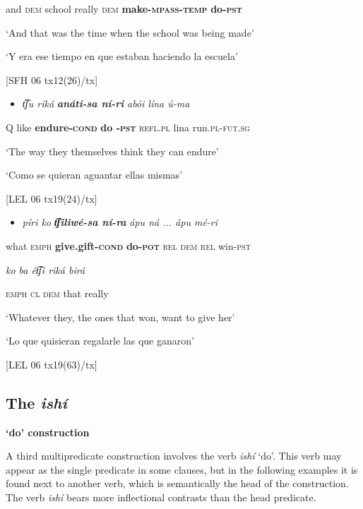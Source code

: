   and   \textsc{dem} school     really   \textsc{dem}   \textbf{make-\textsc{mpass-temp} }\textbf{do\textsc{{}-pst}}   

  ‘And that was the time when the school was being made’

  ‘Y era ese tiempo en que estaban haciendo la escuela’

  [SFH 06 tx12(26)/tx]

\begin{itemize}
\item \textit{t͡ʃu   riká} \textbf{\textit{anáti-sa   ní-ri}} \textit{abói     lína   ú-ma}
\end{itemize}

  Q  like  \textbf{endure-\textsc{cond} }\textbf{do \textsc{-pst}} \textsc{refl.pl} lina run.\textsc{pl}{}-\textsc{fut.sg} 

  ‘The way they themselves think they can endure’

  ‘Como se quieran aguantar ellas mismas’

  [LEL 06 tx19(24)/tx]

\begin{itemize}
\item \textit{píri   ko} \textbf{\textit{t͡ʃiliwé-sa      ní-ra}} \textit{ápu   ná ...   ápu   mé-ri}   
\end{itemize}

  what  \textsc{emph} \textbf{give.gift-\textsc{cond}} \textbf{do\textsc{{}-pot}}  \textsc{rel  dem  rel}  win-\textsc{pst}

 \textit{ko   ba   ét͡ʃi   riká   birá} 

  \textsc{emph  cl  dem} that  really

  ‘Whatever they, the ones that won, want to give her’

  ‘Lo que quisieran regalarle las que ganaron’ 

  [LEL 06 tx19(63)/tx]

\subsection{The \textit{ishí} }\textbf{‘do’ construction}
\label{subsec: the ishi 'do' construction}

A third multipredicate construction involves the verb \textit{ishí} ‘do’. This verb may appear as the single predicate in some clauses, but in the following examples it is found next to another verb, which is semantically the head of the construction. The verb \textit{ishí} bears more inflectional contrasts than the head predicate.


